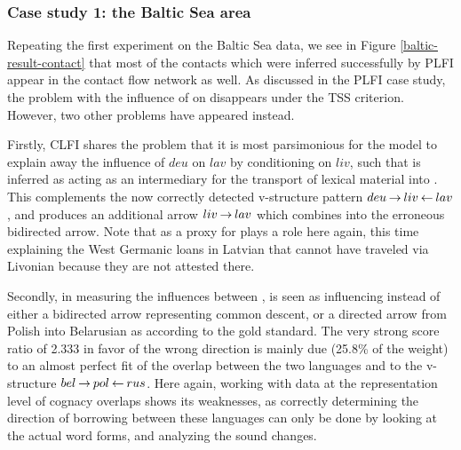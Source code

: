  \subsubsection{Case study 1: the Baltic Sea area}
Repeating the first experiment on the Baltic Sea data, we see in Figure \ref{baltic-result-contact} that most of the contacts which were inferred successfully by PLFI appear in the contact flow network as well. As discussed in the PLFI case study, the problem with the influence of  on  disappears under the TSS criterion. However, two other problems have appeared instead.

Firstly, CLFI shares the problem that it is most parsimonious for the model to explain away the influence of $deu$ on $lav$ by conditioning on $liv$,  such that  is inferred as acting as an intermediary for the transport of  lexical material into . This complements the now correctly detected v-structure pattern $deu \kern 2pt\hbox{$\rightarrow$}\kern 2pt liv \kern 2pt\hbox{$\leftarrow$}\kern 2pt lav$, and produces an additional arrow $liv \kern 2pt\hbox{$\rightarrow$}\kern 2pt lav$ which combines into the erroneous bidirected arrow. Note that  as a proxy for  plays a role here again, this time explaining the West Germanic loans in Latvian that cannot have traveled via Livonian because they are not attested there.

Secondly, in measuring the influences between ,  is seen as influencing  instead of either a bidirected arrow representing common descent, or a directed arrow from Polish into Belarusian as according to the gold standard. The very strong score ratio of 2.333 in favor of the wrong direction is mainly due (25.8\% of the weight) to an almost perfect fit of the overlap between the two languages and  to the v-structure $bel \kern 2pt\hbox{$\rightarrow$}\kern 2pt pol \kern 2pt\hbox{$\leftarrow$}\kern 2pt rus$. Here again, working with data at the representation level of cognacy overlaps shows its weaknesses, as correctly determining the direction of borrowing between these languages can only be done by looking at the actual word forms, and analyzing the sound changes.

